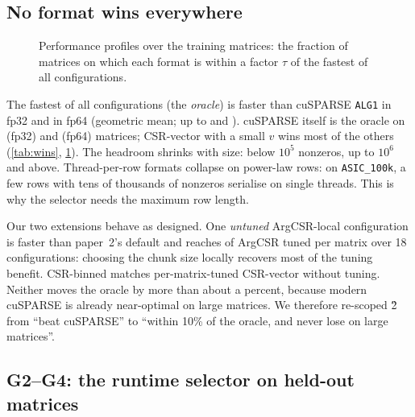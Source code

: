 \subsection{No format wins everywhere}
\begin{figure}[t]
\centering{}
\caption{Performance profiles over the  training matrices: the fraction of matrices on which each
format is within a factor $\tau$ of the fastest of all configurations.}\label{fig:profile}
\end{figure}

The fastest of all configurations (the \emph{oracle}) is \x{} faster than cuSPARSE \texttt{ALG1}
in fp32 and \x{} in fp64 (geometric mean; up to \x{} and
\x). cuSPARSE itself is the oracle on  (fp32) and
 (fp64) matrices; CSR-vector with a small $v$ wins most of the others (\cref{tab:wins},
\cref{fig:profile}). The headroom shrinks with size: \x{} below $10^5$ nonzeros,
\x{} up to $10^6$ and \x{} above. Thread-per-row formats
collapse on power-law rows: on \texttt{ASIC\_100k}, a few rows with tens of thousands of nonzeros serialise on single
threads. This is why the selector needs the maximum row length.

Our two extensions behave as designed. One \emph{untuned} ArgCSR-local configuration is
\x{} faster than paper~2's default and reaches  of ArgCSR tuned per
matrix over 18 configurations: choosing the chunk size locally recovers most of the tuning benefit. CSR-binned matches
per-matrix-tuned CSR-vector without tuning. Neither moves the oracle by more than about a percent, because modern
cuSPARSE is already near-optimal on large matrices. We therefore re-scoped \G2 from ``beat cuSPARSE'' to ``within
10\% of the oracle, and never lose on large matrices''.

\begin{table}[t]
\centering\small
\caption{Which family is fastest, per matrix and precision.}\label{tab:wins}
\end{table}

\subsection{G2--G4: the runtime selector on held-out matrices}\label{sec:eval-g2}
\begin{table}[t]
\centering\small
\caption{Steady-state selection on  held-out samples ( matrices
$\times$ 2 precisions).}\label{tab:g2}
\end{table}

